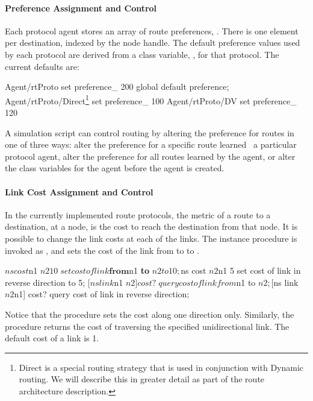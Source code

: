 \paragraph{Preference Assignment and Control}
Each protocol agent stores an array of route preferences, .
There is one element per destination, indexed by the node handle.
The default preference values used by each protocol are derived from
a class variable, , for that protocol.
The current defaults are:
\begin{program}
        Agent/rtProto set preference_ 200               \; global default preference;
        Agent/rtProto/Direct\footnote{Direct is a special routing strategy that is used in conjunction with Dynamic routing.  We will describe this in greater detail as part of the route architecture description.} set preference_ 100
        Agent/rtProto/DV set preference_ 120
\end{program}
A simulation script can control routing by altering the preference
for routes in one of three ways:
alter the preference 
for a specific route learned \via\ a particular protocol agent,
alter the preference for all routes learned by the agent, or
alter the class variables for the agent before the agent is created.

\paragraph{Link Cost Assignment and Control}
In the currently implemented route protocols,
the metric of a route to a destination, at a node,
is the cost to reach the destination from that node.
It is possible to change the link costs at each of the links.
The instance procedure
is invoked as ,
and sets the cost of the link from  to 
to .
\begin{program}
        $ns cost $n1 $n2 10        \; set cost of link \textbf{from} $n1 \textbf{to} $n2 to 10;
        $ns cost $n2 $n1  5        \; set cost of link in reverse direction to 5;
        [$ns link $n1 $n2] cost?   \; query cost of link from $n1 to $n2;
        [$ns link $n2 $n1] cost?   \; query cost of link in reverse direction;
\end{program}
Notice that the procedure sets the cost along one direction only.
Similarly, the procedure
returns the cost of traversing the specified unidirectional link.
The default cost of a link is 1.

